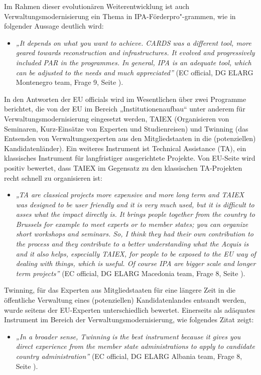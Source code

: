 Im Rahmen dieser evolutionären Weiterentwicklung ist auch Verwaltungsmodernisierung ein Thema in IPA-Förderpro"-grammen, wie in folgender Aussage deutlich wird:
\begin{itemize}[label={}]
\item \textit{„It depends on what you want to achieve. CARDS was a different tool, more geared towards reconstruction and infrastructures. It evolved and progressively included PAR in the programmes. In general, IPA is an adequate tool, which can be adjusted to the needs and much appreciated”} (EC official, DG ELARG Montenegro team, Frage 9, Seite \pageref{sec:technical}).
\end{itemize}
In den Antworten der EU officials wird im Wesentlichen über zwei Programme berichtet, die von der EU im Bereich „Institutionenaufbau“ unter anderem für Verwaltungsmodernisierung eingesetzt werden, TAIEX (Organisieren von Seminaren, Kurz-Einsätze von Experten und Studienreisen) und Twinning (das Entsenden von Verwaltungsexperten aus den Mitgliedstaaten in die (potenziellen) Kandidatenländer). Ein weiteres Instrument ist Technical Assistance (TA), ein klassisches Instrument für langfristiger ausgerichtete Projekte. Von EU-Seite wird positiv bewertet, dass TAIEX im Gegensatz zu den klassischen TA-Projekten recht schnell zu organisieren ist:
\begin{itemize}[label={}]
\item \textit{„TA are classical projects more expensive and more long term and TAIEX was designed to be user friendly and it is very much used, but it is difficult to asses what the impact directly is. It brings people together from the country to Brussels for example to meet experts or to member states; you can organize short workshops and seminars. So, I think they had their own contribution to the process and they contribute to a better understanding what the Acquis is and it also helps, especially TAIEX, for people to be exposed to the EU way of dealing with things, which is useful. Of course IPA are bigger scale and longer term projects”} (EC official, DG ELARG Macedonia team, Frage 8, Seite \pageref{sec:relevant}).
\end{itemize}
Twinning, für das Experten aus Mitgliedstaaten für eine längere Zeit in die öffentliche Verwaltung eines (potenziellen) Kandidatenlandes entsandt werden, wurde seitens der EU-Experten unterschiedlich bewertet. Einerseits als adäquates Instrument im Bereich der Verwaltungsmodernisierung, wie folgendes Zitat zeigt:
\begin{itemize}[label={}]
\item \textit{„In a broader sense, Twinning is the best instrument because it gives you direct experience from the member state administrations to apply to candidate country administration”} (EC official, DG ELARG Albania team, Frage 8, Seite \pageref{sec:relevant}).
\end{itemize}

